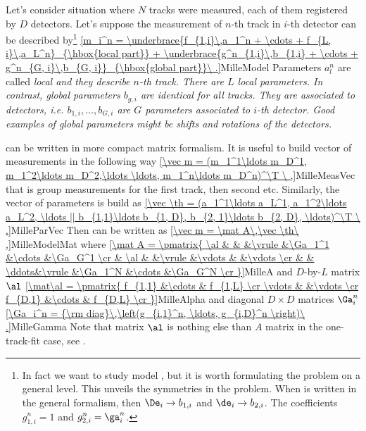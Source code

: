 Let's consider situation where $N$ tracks were measured, each of them registered by $D$ detectors. Let's suppose the measurement of $n$-th track in $i$-th detector can be described by\footnote{%
In fact we want to study model , but it is worth formulating the problem on a general level. This unveils the symmetries in the problem. When  is written in the general formalism, then $\De_i\to b_{1,i}$ and $\de_i\to b_{2,i}$. The coefficients $g_{1,i}^n=1$ and $g_{2,i}^n = \ga_i^n$.
}
\eqref{m_i^n = \underbrace{f_{1,i}\,a_1^n + \cdots + f_{L, i}\,a_L^n}_{\hbox{local part}} + 
\underbrace{g^n_{1,i}\,b_{1,i} + \cdots + g^n_{G, i}\,b_{G, i}}_{\hbox{global part}}\ .}{MilleModel}
Parameters $a_l^n$ are called \em{local} and they describe $n$-th track. There are $L$ local parameters. In contrast, \em{global} parameters $b_{g, i}$ are identical for all tracks. They are associated to detectors, i.e. $b_{1, i},\ldots,b_{G, i}$ are $G$ parameters associated to $i$-th detector. Good examples of global parameters might be shifts and rotations of the detectors.

 can be written in more compact matrix formalism. It is useful to build vector of measurements in the following way
\eqref{\vec m = (m_1^1\ldots m_D^1, m_1^2\ldots m_D^2,\ldots \ldots, m_1^n\ldots m_D^n)^\T \ ,}{MilleMeasVec}
that is group measurements for the first track, then second etc. Similarly, the vector of parameters is build as
\eqref{\vec \th = (a_1^1\ldots a_L^1, a_1^2\ldots a_L^2, \ldots || b_{1,1}\ldots b_{1, D}, b_{2, 1}\ldots b_{2, D}, \ldots)^\T \ .}{MilleParVec}
Then  can be written as
\eqref{\vec m = \mat A\,\vec \th\ ,}{MilleModelMat}
where
\eqref{\mat A = \pmatrix{
\al & 		&		&\vrule	&\Ga_1^1	&\cdots	&\Ga_G^1	\cr
	& \al	&		&\vrule	&\vdots		&		&\vdots		\cr
	&		& \ddots&\vrule	&\Ga_1^N	&\cdots	&\Ga_G^N	\cr
}}{MilleA}
and $D$-by-$L$ matrix $\al$
\eqref{\mat\al = \pmatrix{
f_{1,1}	&\cdots	& f_{1,L}	\cr
\vdots	&		&\vdots		\cr
f_{D,1}	&\cdots	& f_{D,L}	\cr
}}{MilleAlpha}
and diagonal $D\times D$ matrices $\Ga_i^n$
\eqref{\Ga_i^n = {\rm diag}\,\left(g_{i,1}^n, \ldots, g_{i,D}^n \right)\ .}{MilleGamma}
Note that matrix $\al$ is nothing else than $A$ matrix in the one-track-fit case, see .

